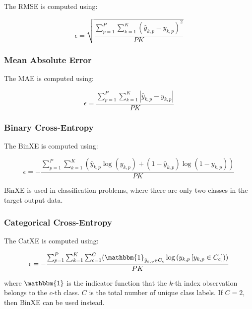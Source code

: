 The \ac{RMSE} is computed using:

\begin{equation}
    \epsilon = \sqrt{\frac{\sum_{p=1}^P \sum_{k=1}^K (\hat{y}_{k,p} - y_{k,p})^2}{PK}}
    \label{eq:rmse}
\end{equation}


\subsubsection{Mean Absolute Error}
\label{sec:anns:training:error_functions:mae}

The \ac{MAE} is computed using:

\begin{equation}
    \epsilon = \frac{\sum_{p=1}^P \sum_{k=1}^K |\hat{y}_{k,p} - y_{k,p}|}{PK}
    \label{eq:mae}
\end{equation}


\subsubsection{Binary Cross-Entropy}
\label{sec:anns:training:error_functions:bin_xe}

\noindent The \ac{BinXE} is computed using:

\begin{equation}
    \epsilon = -\frac{\sum_{p=1}^P \sum_{k=1}^K (\hat{y}_{k,p} \log{(y_{k,p})} + (1 - \hat{y}_{k,p})\log{(1 - y_{k,p})})}{PK}
    \label{eq:bin_xe}
\end{equation}

\noindent \ac{BinXE} is used in classification problems, where there are only
two classes in the target output data.


\subsubsection{Categorical Cross-Entropy}
\label{sec:anns:training:error_functions:cat_xe}

The \ac{CatXE} is computed using:

\begin{equation}
    \epsilon = -\frac{\sum_{p=1}^P \sum_{k=1}^K \sum_{c=1}^C (\mathbbm{1}_{\hat{y}_{k,p} \in C_c} \log{(y_{k,p} \left[ y_{k,p} \in C_c \right])})}{PK}
    \label{eq:cat_xe}
\end{equation}

\noindent where $\mathbbm{1}$ is the indicator function that the $k$-th index observation
belongs to the $c$-th class. $C$ is the total number of unique class labels. If
$C = 2$, then \ac{BinXE} can be used instead.


